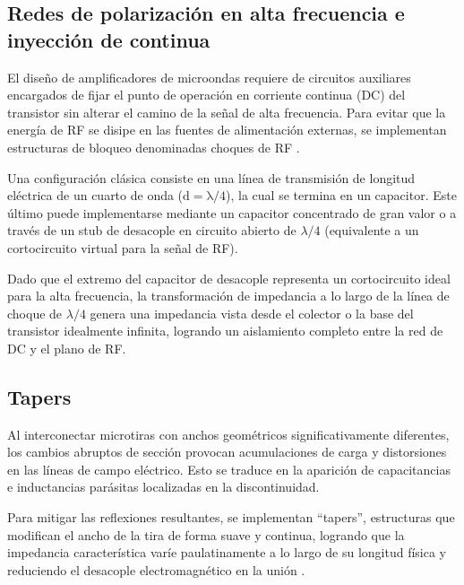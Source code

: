 \documentclass{article}
\begin{document}
\subsection{Redes de polarización en alta frecuencia e inyección de continua} \label{section:sec_2.9}

El diseño de amplificadores de microondas requiere de circuitos auxiliares encargados de fijar el punto de operación en corriente continua (DC) del transistor sin alterar el camino de la señal de alta frecuencia. Para evitar que la energía de RF se disipe en las fuentes de alimentación externas, se implementan estructuras de bloqueo denominadas choques de RF \cite[Sec.~3.9]{gonzalez_amplifiers}.

Una configuración clásica consiste en una línea de transmisión de longitud eléctrica de un cuarto de onda ($\mathrm{d = \lambda/4}$), la cual se termina en un capacitor. Este último puede implementarse mediante un capacitor concentrado de gran valor o a través de un stub de desacople en circuito abierto de $\lambda/4$ (equivalente a un cortocircuito virtual para la señal de RF).

Dado que el extremo del capacitor de desacople representa un cortocircuito ideal para la alta frecuencia, la transformación de impedancia a lo largo de la línea de choque de $\lambda/4$ genera una impedancia vista desde el colector o la base del transistor idealmente infinita, logrando un aislamiento completo entre la red de DC y el plano de RF.
\\



\subsection{Tapers} \label{section:sec_2.10}
Al interconectar microtiras con anchos geométricos significativamente diferentes, los cambios abruptos de sección provocan acumulaciones de carga y distorsiones en las líneas de campo eléctrico. Esto se traduce en la aparición de capacitancias e inductancias parásitas localizadas en la discontinuidad. 

Para mitigar las reflexiones resultantes, se implementan ``tapers'', estructuras que modifican el ancho de la tira de forma suave y continua, logrando que la impedancia característica varíe paulatinamente a lo largo de su longitud física y reduciendo el desacople electromagnético en la unión \cite{Tapers}. 



\newpage
\end{document}

